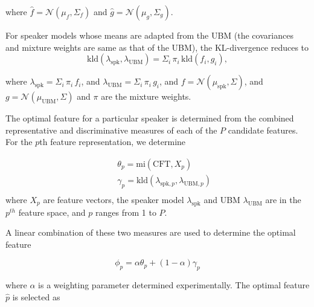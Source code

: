 \documentclass{article}
\begin{document}
where $\hat{f} = \mathcal{N}(\mu_f,\Sigma_f)$ and $\hat{g} = \mathcal{N}(\mu_g,\Sigma_g)$.

For speaker models whose means are adapted from the UBM (the 
covariances and mixture weights are same as that of the UBM), the KL-divergence
reduces to 
\begin{equation}
\textrm{kld}(\lambda_{\textrm{spk}},\lambda_{\textrm{UBM}}) = 
	\Sigma_i\, \pi_i\, \textrm{kld}(f_i,g_i),
\label{eq:gmmAdaptedKLD}
\end{equation}


where $\lambda_{\textrm{spk}} = \Sigma_i \, \pi_i \, f_i$, and
$\lambda_{\textrm{UBM}} = \Sigma_i \, \pi_i \, g_i$, and
$f = \mathcal{N}(\mu_{\textrm{spk}},\Sigma)$, and
$g = \mathcal{N}(\mu_{\textrm{UBM}},\Sigma)$ and
$\pi$ are the mixture weights.


The optimal feature for a particular speaker is determined from the combined
representative and discriminative measures of each of the $P$ candidate
features. For the $p$th feature representation, we determine

\begin{eqnarray*}
&& \theta_p = \textrm{mi}(\textrm{CFT},X_{p}) \\ && \gamma_p =
\textrm{kld}(\lambda_{\textrm{spk},p},\lambda_{\textrm{UBM},p}) \\
\end{eqnarray*} 
where $X_p$ are feature vectors, the speaker model $\lambda_{\textrm{spk}}$ and 
UBM $\lambda_{\textrm{UBM}}$ are in the $p^{th}$ feature space, and $p$ ranges from 1 to $P$.




A linear combination of these two measures are used to determine the optimal
feature

\begin{equation}
\phi_p = \alpha \theta_p  + (1-\alpha) \gamma_p
\end{equation}

where $\alpha$ is a weighting parameter determined experimentally. The optimal
feature $\hat{p}$ is selected as 
\end{document}
